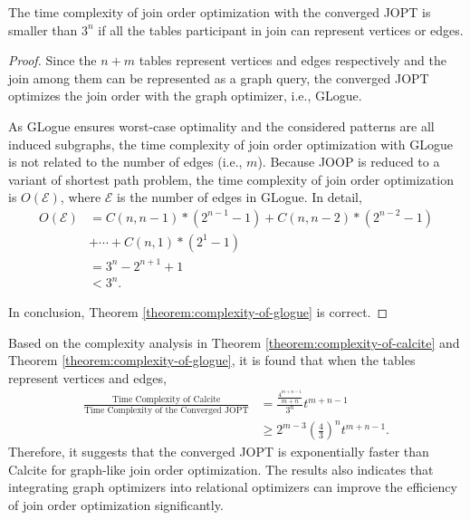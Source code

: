 \begin{theorem}
    \label{theorem:complexity-of-glogue}
    The time complexity of join order optimization with the converged JOPT is smaller than $3^n$ if all the tables participant in join can represent vertices or edges.
\end{theorem}
\begin{proof}
    Since the $n + m$ tables represent vertices and edges respectively and the join among them can be represented as a graph query, the converged JOPT optimizes the join order with the graph optimizer, i.e., GLogue.

    As GLogue ensures worst-case optimality and the considered patterns are all induced subgraphs, the time complexity of join order optimization with GLogue is not related to the number of edges (i.e., $m$).
    Because JOOP is reduced to a variant of shortest path problem, the time complexity of join order optimization is $O(\mathcal{E})$, where $\mathcal{E}$ is the number of edges in GLogue.
    In detail, 
    \begin{equation*}
        \begin{split}
            O(\mathcal{E}) & = C(n, n-1)*(2^{n-1}-1) + C(n, n-2) * (2^{n-2}- 1) \\
            & + \cdots + C(n, 1) * (2^1 - 1) \\
            & = 3^n - 2^{n+1} +1 \\
            & < 3^n.
        \end{split}
    \end{equation*}
    
    In conclusion, Theorem \ref{theorem:complexity-of-glogue} is correct.

\end{proof}

Based on the complexity analysis in Theorem \ref{theorem:complexity-of-calcite} and Theorem \ref{theorem:complexity-of-glogue}, it is found that when the tables represent vertices and edges, 
\begin{equation*}
    \begin{split}
        \frac{\text{Time Complexity of Calcite}}{\text{Time Complexity of the Converged JOPT}} & = \frac{\frac{4^{m+n-1}}{m+n}}{3^n}t^{m+n-1} \\
        & \geq 2^{m-3}(\frac{4}{3})^nt^{m+n-1}.
    \end{split}
\end{equation*}
Therefore, it suggests that the converged JOPT is exponentially faster than Calcite for graph-like join order optimization.
The results also indicates that integrating graph optimizers into relational optimizers can improve the efficiency of join order optimization significantly.


